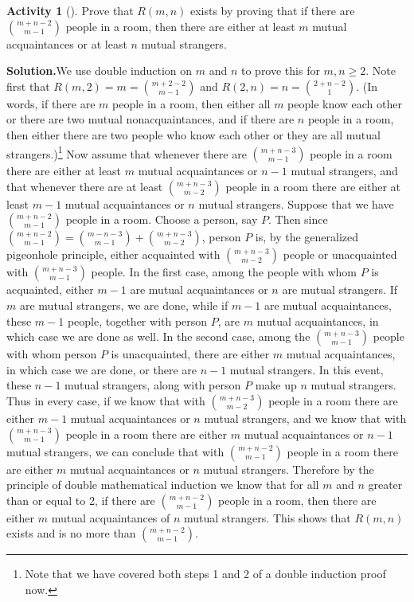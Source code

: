 \documentclass[10pt,]{book}
\theoremstyle{plain}
\theoremstyle{definition}
\newtheorem{activity}[project]{Activity}
\numberwithin{equation}{chapter}
\begin{document}
\begin{activity}[]\label{Ramseybound}
Prove that \(R(m,n)\) exists by proving that if there are \(\binom{m+n-2}{m-1}\) people in a room, then there are either at least \(m\) mutual acquaintances or at least \(n\) mutual strangers.%
\par\medskip\noindent%
\textbf{Solution.}\quad We use double induction on \(m\) and \(n\) to prove this for \(m,n\ge 2\). Note first that \(R(m,2)=m=\binom{m+2-2}{m-1}\) and \(R(2,n)
=n=\binom{2+n-2}{1}\). (In words, if there are \(m\) people in a room, then either all \(m\) people know each other or there are two mutual nonacquaintances, and if there are \(n\) people in a room, then either there are two people who know each other or they are all mutual strangers.)\footnote{Note that we have covered both steps 1 and 2 of a double induction proof now.\label{fn-5}} Now assume that whenever there are \(\binom{m+n-3}{m-1}\) people in a room there are either at least \(m\) mutual acquaintances or \(n-1\) mutual strangers, and that whenever there are at least \(\binom{m+n-3}{m-2}\) people in a room there are either at least \(m-1\) mutual acquaintances or \(n\) mutual strangers. Suppose that we have \(\binom{m+n-2}{m-1}\) people in a room. Choose a person, say \(P\). Then since \(\binom{m+n-2}{m-1} = \binom{m-n-3}{m-1} +\binom{m+n-3}{m-2}\), person \(P\) is, by the generalized pigeonhole principle, either acquainted with \(\binom{m+n-3}{m-2}\) people or unacquainted with \(\binom{m+n-3}{m-1}\) people. In the first case, among the people with whom \(P\) is acquainted, either \(m-1\) are mutual acquaintances or \(n\) are mutual strangers. If \(m\) are mutual strangers, we are done, while if \(m-1\) are mutual acquaintances, these \(m-1\) people, together with person \(P\), are \(m\) mutual acquaintances, in which case we are done as well. In the second case, among the \(\binom{m+n-3}{m-1}\) people with whom person \(P\) is unacquainted, there are either \(m\) mutual acquaintances, in which case we are done, or there are \(n-1\) mutual strangers. In this event, these \(n-1\) mutual strangers, along with person \(P\) make up \(n\) mutual strangers. Thus in every case, if we know that with \(\binom{m+n-3}{m-2}\) people in a room there are either \(m-1\) mutual acquaintances or \(n\) mutual strangers, and we know that with \(\binom{m+n-3}{m-1}\) people in a room there are either \(m\) mutual acquaintances or \(n-1\) mutual strangers, we can conclude that with \(\binom{m+n-2}{m-1}\) people in a room there are either \(m\) mutual acquaintances or \(n\) mutual strangers. Therefore by the principle of double mathematical induction we know that for all \(m\) and \(n\) greater than or equal to 2, if there are \(\binom{m+n-2}{m-1}\) people in a room, then there are either \(m\) mutual acquaintances of \(n\) mutual strangers. This shows that \(R(m,n)\) exists and is no more than \(\binom{m+n-2}{m-1}\).%
\end{activity}
\end{document}
